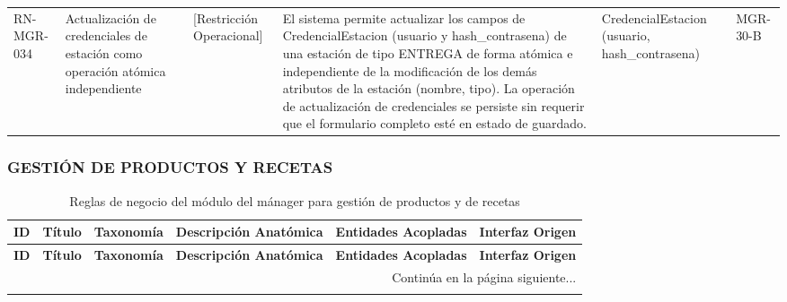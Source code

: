 \begin{landscape}
\begin{longtable}[c]{l p{2.1cm} p{2.1cm} p{8cm} p{4cm} p{3cm}}
\addlinespace
RN-MGR-034 & Actualización de credenciales de estación como operación atómica independiente & [Restricción Operacional] & El sistema permite actualizar los campos de CredencialEstacion (usuario y hash\_contrasena) de una estación de tipo ENTREGA de forma atómica e independiente de la modificación de los demás atributos de la estación (nombre, tipo). La operación de actualización de credenciales se persiste sin requerir que el formulario completo esté en estado de guardado. & CredencialEstacion (usuario, hash\_contrasena) & MGR-30-B \\
\end{longtable}
\endgroup

\subsubsection{GESTIÓN DE PRODUCTOS Y RECETAS}
\begingroup
\setlength{\LTleft}{\fill}
\setlength{\LTright}{\fill}

\begin{longtable}[c]{l p{2.1cm} p{2.1cm} p{8cm} p{4cm} p{3cm}}
\caption{Reglas de negocio del módulo del mánager para gestión de productos y de recetas} \label{tab:reglas-negocio-manager-recetas}\\
\toprule
\textbf{ID} & \textbf{Título} & \textbf{Taxonomía} & \textbf{Descripción Anatómica} & \textbf{Entidades Acopladas} & \textbf{Interfaz Origen} \\
\midrule
\endfirsthead

\toprule
\textbf{ID} & \textbf{Título} & \textbf{Taxonomía} & \textbf{Descripción Anatómica} & \textbf{Entidades Acopladas} & \textbf{Interfaz Origen} \\
\midrule
\endhead

\midrule
\multicolumn{6}{r}{\small Continúa en la página siguiente...} \\
\endfoot
\bottomrule
\endlastfoot


\end{longtable}
\end{landscape}

